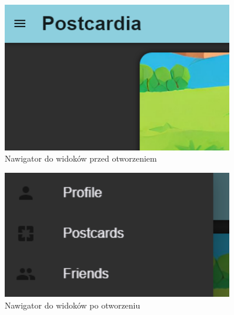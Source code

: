 \documentclass[a4paper,twoside,12pt]{book}
\begin{document}
\begin{figure}[H]
    \centering
    \includegraphics[width=0.9\textwidth]{webowka_ss/navigator_close.png}
    \caption{Nawigator do widoków przed otworzeniem}
\end{figure}
\begin{figure}[H]
    \centering
    \includegraphics[width=0.9\textwidth]{webowka_ss/navigator_open.png}
    \caption{Nawigator do widoków po otworzeniu}
\end{figure}
\end{document}
